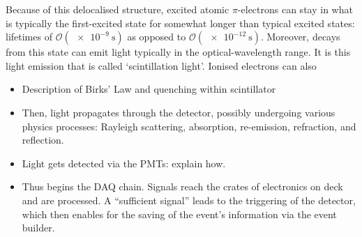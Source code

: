 \begin{figure}
    \centering
    \caption[]{}
    \label{fig:benzene_pi_bonds}
\end{figure}

Because of this delocalised structure, excited atomic $\pi$-electrons can stay in what is typically the first-excited state for somewhat longer than typical excited states: lifetimes of $\mathcal{O}(\SI{e-9}{\second})$ as opposed to $\mathcal{O}(\SI{e-12}{\second})$. Moreover, decays from this state can emit light typically in the optical-wavelength range. It is this light emission that is called `scintillation light'. Ionised electrons can also 

{
    \color{blue}
    \begin{itemize}
        \item Description of Birks' Law and quenching within scintillator
        \item Then, light propagates through the detector, possibly undergoing various physics processes: Rayleigh scattering, absorption, re-emission, refraction, and reflection.
        \item Light gets detected via the PMTs: explain how.
        \item Thus begins the DAQ chain. Signals reach the crates of electronics on deck and are processed. A ``sufficient signal'' leads to the triggering of the detector, which then enables for the saving of the event's information via the event builder.
    \end{itemize}
}
